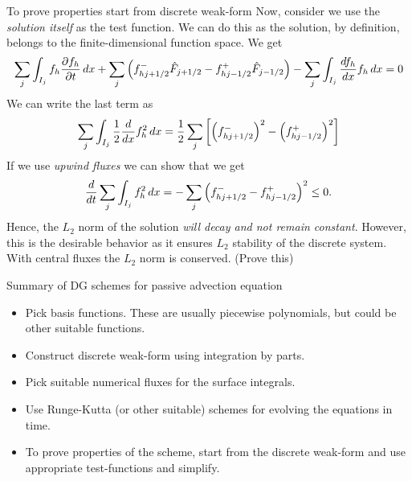 \documentclass[aspectratio=169]{beamer}
\newcommand{\pfrac}[2]{\frac{\partial #1}{\partial #2}}
\begin{document}
\begin{frame}{To prove properties start from discrete weak-form}
  \footnotesize%
  Now, consider we use the \emph{solution itself} as the test
  function. We can do this as the solution, by definition, belongs to
  the finite-dimensional function space. We get
  \begin{align*}
    \sum_j \int_{I_j} f_h \pfrac{f_h}{t}\thinspace dx
    +
    \sum_j \left(f_{hj+1/2}^-\hat{F}_{j+1/2} - f_{hj-1/2}^+\hat{F}_{j-1/2}\right)
    -
    \sum_j \int_{I_j}  \frac{d f_h}{dx} f_h\thinspace dx = 0
  \end{align*}
  We can write the last term as
  \begin{align*}
    \sum_j \int_{I_j}  \frac{1}{2} \frac{d}{dx} f_h^2 \thinspace dx
    = \frac{1}{2} \sum_j \left[ \left(f_{hj+1/2}^-\right)^2  - \left(f_{hj-1/2}^+\right)^2 \right]
  \end{align*}
  If we use \emph{upwind fluxes} we can show that we get
  \begin{align*}
    \frac{d}{dt} \sum_j \int_{I_j}  f_h^2 \thinspace dx
    =
    -\sum_j \left(f_{hj+1/2}^- - f_{hj-1/2}^+\right)^2 \le 0.
  \end{align*}
  Hence, the $L_2$ norm of the solution \emph{will decay and not
    remain constant}. However, this is the desirable behavior as it
  ensures $L_2$ stability of the discrete system. With central fluxes
  the $L_2$ norm is conserved. (Prove this)
\end{frame}


\begin{frame}{Summary of DG schemes for passive advection equation}

  \begin{itemize}
  \item Pick basis functions. These are usually piecewise polynomials,
    but could be other suitable functions.
  \item Construct discrete weak-form using integration by parts.
  \item Pick suitable numerical fluxes for the surface integrals.
  \item Use Runge-Kutta (or other suitable) schemes for evolving the
    equations in time.
  \item To prove properties of the scheme, start from the discrete
    weak-form and use appropriate test-functions and simplify.
  \end{itemize}

\end{frame}
\end{document}
